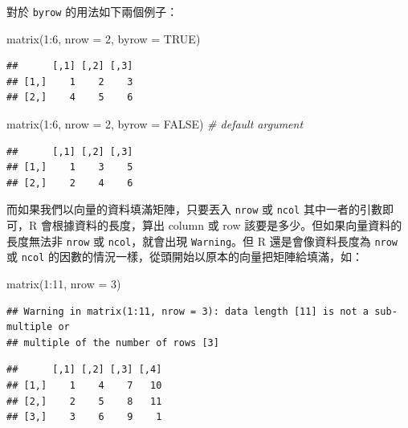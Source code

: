 \documentclass[
]{book}
\newenvironment{Shaded}{\begin{snugshade}}{\end{snugshade}}
\newcommand{\AttributeTok}[1]{\textcolor[rgb]{0.77,0.63,0.00}{#1}}
\newcommand{\CommentTok}[1]{\textcolor[rgb]{0.56,0.35,0.01}{\textit{#1}}}
\newcommand{\ConstantTok}[1]{\textcolor[rgb]{0.00,0.00,0.00}{#1}}
\newcommand{\DecValTok}[1]{\textcolor[rgb]{0.00,0.00,0.81}{#1}}
\newcommand{\FunctionTok}[1]{\textcolor[rgb]{0.00,0.00,0.00}{#1}}
\newcommand{\NormalTok}[1]{#1}
\newcommand{\SpecialCharTok}[1]{\textcolor[rgb]{0.00,0.00,0.00}{#1}}
\theoremstyle{definition}
\theoremstyle{remark}
\begin{document}
對於 \texttt{byrow} 的用法如下兩個例子：

\begin{Shaded}
\begin{Highlighting}[]
\FunctionTok{matrix}\NormalTok{(}\DecValTok{1}\SpecialCharTok{:}\DecValTok{6}\NormalTok{, }\AttributeTok{nrow =} \DecValTok{2}\NormalTok{, }\AttributeTok{byrow =} \ConstantTok{TRUE}\NormalTok{)}
\end{Highlighting}
\end{Shaded}

\begin{verbatim}
##      [,1] [,2] [,3]
## [1,]    1    2    3
## [2,]    4    5    6
\end{verbatim}

\begin{Shaded}
\begin{Highlighting}[]
\FunctionTok{matrix}\NormalTok{(}\DecValTok{1}\SpecialCharTok{:}\DecValTok{6}\NormalTok{, }\AttributeTok{nrow =} \DecValTok{2}\NormalTok{, }\AttributeTok{byrow =} \ConstantTok{FALSE}\NormalTok{)  }\CommentTok{\# default argument}
\end{Highlighting}
\end{Shaded}

\begin{verbatim}
##      [,1] [,2] [,3]
## [1,]    1    3    5
## [2,]    2    4    6
\end{verbatim}

而如果我們以向量的資料填滿矩陣，只要丟入 \texttt{nrow} 或 \texttt{ncol} 其中一者的引數即可，R 會根據資料的長度，算出 column 或 row 該要是多少。但如果向量資料的長度無法非 \texttt{nrow} 或 \texttt{ncol}，就會出現 \texttt{Warning}。但 R 還是會像資料長度為 \texttt{nrow} 或 \texttt{ncol} 的因數的情況一樣，從頭開始以原本的向量把矩陣給填滿，如：

\begin{Shaded}
\begin{Highlighting}[]
\FunctionTok{matrix}\NormalTok{(}\DecValTok{1}\SpecialCharTok{:}\DecValTok{11}\NormalTok{, }\AttributeTok{nrow =} \DecValTok{3}\NormalTok{)}
\end{Highlighting}
\end{Shaded}

\begin{verbatim}
## Warning in matrix(1:11, nrow = 3): data length [11] is not a sub-multiple or
## multiple of the number of rows [3]
\end{verbatim}

\begin{verbatim}
##      [,1] [,2] [,3] [,4]
## [1,]    1    4    7   10
## [2,]    2    5    8   11
## [3,]    3    6    9    1
\end{verbatim}
\end{document}
